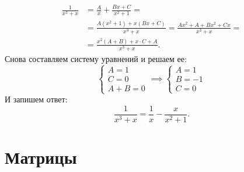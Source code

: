 \documentclass[12pt, a4paper]{article}
\begin{document}
    \begin{exmp}
        \begin{align*}
            \frac{1}{x^3  + x} & = \frac{A}{x} + \frac{Bx + C}{x^2 + 1} =\\
                                                                      &=\frac{A(x^2 + 1) + x(Bx + C)}{x^3  + x} = \frac{Ax^2 + A + Bx^2 + Cx}{x^3 +x} = \\
                                                                      &= \frac{x^2(A + B) + x\cdot C + A}{x^3  + x}.
        \end{align*}
        Снова составляем систему уравнений и решаем ее: \[
            \begin{cases}
                A = 1 \\
                C = 0 \\
                A + B = 0
            \end{cases} \implies \begin{cases}
                A = 1 \\
                B = -1 \\
                C = 0
            \end{cases}
        \] И запишем ответ: \[
            \frac{1}{x^3 + x} = \frac{1}{x} - \frac{x}{x^2 + 1}.
        \]  
        
    \end{exmp}
    \section{Матрицы}
\end{document}
